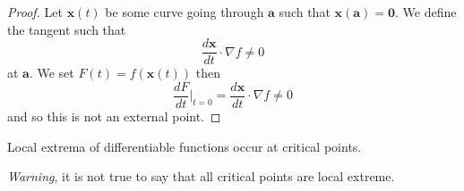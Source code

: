 \begin{proof}
    Let $\bm x(t)$ be some curve going through $\bm a$ such that $\bm x(\bm a) = \bm 0$. 
    We define the tangent such that
    \[ \frac{d\bm x}{dt} \cdot \nabla f \neq 0 \]
    at $\bm a$.
    We set $F(t) = f(\bm x(t))$ then
    \[ \frac{dF}{dt} \Bigr|_{t = 0} = \frac{d\bm x}{dt} \cdot \nabla f \neq 0 \]
    and so this is not an external point. %
\end{proof}

\begin{proposition}[]
    Local extrema of differentiable functions occur at critical points.
\end{proposition}

\begin{remark}
    \emph{Warning}, it is not true to say that all critical points are local extreme.
\end{remark}
